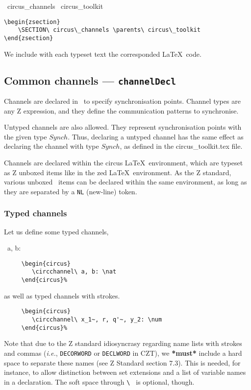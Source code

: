 \documentclass{article}
\newcommand{\grammar}[1]{\texttt{#1}}
\begin{document}
\begin{zsection}
  \SECTION\ circus\_channels \parents\ circus\_toolkit
\end{zsection}%
%
\begin{verbatim}
\begin{zsection}
    \SECTION\ circus\_channels \parents\ circus\_toolkit
\end{zsection}
\end{verbatim}
%
We include with each typeset text the corresponded \LaTeX\ code.


\subsection{Common channels --- \grammar{channelDecl}}

Channels are declared in \Circus\ to specify synchronisation points. Channel
types are any Z expression, and they define the communication patterns to
synchronise.

Untyped channels are also allowed. They represent synchronisation points with
the given type $Synch$. Thus, declaring a untyped channel has the same effect
as declaring the channel with type $Synch$, as defined in the
\textsf{circus\_toolkit.tex} file.

Channels are declared within the \textsf{circus} \LaTeX\ environment, which are
typeset as Z unboxed items like in the \textsf{zed} \LaTeX\ environment. As the
Z standard, various unboxed \Circus\ items can be declared within the same
environment, as long as they are separated by a \grammar{NL} (new-line) token.

\subsubsection{Typed channels}

Let us define some typed channels,
%
\begin{circus}
  \circchannel\ a, b: \nat
\end{circus}%
%
\begin{verbatim}
     \begin{circus}
        \circchannel\ a, b: \nat
     \end{circus}%
\end{verbatim}
%
as well as typed channels with strokes.
%
%
%
\begin{verbatim}
     \begin{circus}
        \circchannel\ x_1~, r, q'~, y_2: \num
     \end{circus}%
\end{verbatim}
%
Note that due to the Z standard idiosyncrasy regarding name lists with strokes
and commas (\textit{i.e.}, \grammar{DECORWORD} or \grammar{DECLWORD} in CZT),
we \textbf{*must*} include a hard space to separate these names (see Z Standard
section 7.3). This is needed, for instance, to allow distinction between set
extensions and a list of variable names in a declaration. The soft space
through \verb'\ ' is optional, though.
\end{document}
